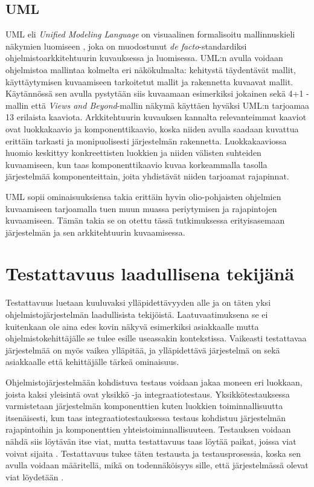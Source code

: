 \documentclass[finnish]{tktltiki2}
\numberwithin{table}{section}
\theoremstyle{definition}
\theoremstyle{remark}
\begin{document}
\subsection{UML}

UML eli \textit{Unified Modeling Language} on visuaalinen formalisoitu mallinnuskieli näkymien luomiseen \citep{UML}, joka on muodostunut \textit{de facto}-standardiksi ohjelmistoarkkitehtuurin kuvauksessa ja luomisessa. UML:n avulla voidaan ohjelmistoa mallintaa kolmelta eri näkökulmalta: kehitystä täydentävät mallit, käyttäytymisen kuvaamiseen tarkoitetut mallit ja rakennetta kuvaavat mallit. Käytännössä sen avulla pystytään siis kuvaamaan esimerkiksi jokainen sekä 4+1 -mallin että \textit{Views and Beyond}-mallin näkymä käyttäen hyväksi UML:n tarjoamaa 13 erilaista kaaviota. Arkkitehtuurin kuvauksen kannalta relevanteimmat kaaviot ovat luokkakaavio ja komponenttikaavio, koska niiden avulla saadaan kuvattua erittäin tarkasti ja monipuolisesti järjestelmän rakennetta. Luokkakaaviossa huomio keskittyy konkreettisten luokkien ja niiden välisten suhteiden kuvaamiseen, kun taas komponenttikaavio kuvaa korkeammalla tasolla järjestelmää komponenteittain, joita yhdistävät niiden tarjoamat rajapinnat.   

UML sopii ominaisuuksiensa takia erittäin hyvin olio-pohjaisten ohjelmien kuvaamiseen tarjoamalla tuen muun muassa periytymisen ja rajapintojen kuvaamiseen. Tämän takia se on otettu tässä tutkimuksessa erityisasemaan järjestelmän ja sen arkkitehtuurin kuvaamisessa.


\section{Testattavuus laadullisena tekijänä} \label{testability_main}
Testattavuus luetaan kuuluvaksi ylläpidettävyyden alle \citep{ISO/IEC25010:2011} ja on täten yksi ohjelmistojärjestelmän laadullisista tekijöistä. Laatuvaatimuksena se ei kuitenkaan ole aina edes kovin näkyvä esimerkiksi asiakkaalle mutta ohjelmistokehittäjälle se tulee esille useassakin kontekstissa. Vaikeasti testattavaa järjestelmää on myös vaikea ylläpitää, ja ylläpidettävä järjestelmä on sekä asiakkaalle että kehittäjälle tärkeä ominaisuus.

Ohjelmistojärjestelmään kohdistuva testaus voidaan jakaa moneen eri luokkaan, joista kaksi yleisintä ovat yksikkö -ja integraatiotestaus. Yksikkötestauksessa varmistetaan järjestelmän komponenttien kuten luokkien toiminnallisuutta itsenäisesti, kun taas integraatiotestauksessa testaus kohdistuu järjestelmän rajapintoihin ja komponenttien yhteistoiminnallisuuteen. Testauksen voidaan nähdä siis löytävän itse viat, mutta testattavuus taas löytää paikat, joissa viat voivat sijaita \citep[s. 19]{Voas:1995:STN:624607.625469}. Testattavuus tukee täten testausta ja testausprosessia, koska sen avulla voidaan määritellä, mikä on todennäköisyys sille, että järjestelmässä olevat viat löydetään \citep{voas_improving_1992}. 
\end{document}
